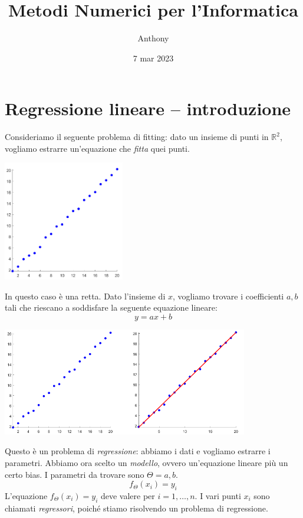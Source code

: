 \documentclass{article}
\title{Metodi Numerici per l'Informatica}
\author{Anthony}
\date{7 mar 2023}
\begin{document}
    \maketitle
    \section{Regressione lineare -- introduzione}
        Consideriamo il seguente problema di fitting: dato un insieme di punti in $\mathbb{R}^2$, vogliamo estrarre un'equazione 
        che \emph{fitta} quei punti.
        \begin{center}\includegraphics[width=5.3cm]{graph_01.png}\end{center}
        In questo caso è una retta. Dato l'insieme di $x$, vogliamo trovare i coefficienti $a, b$ tali che riescano a soddisfare la 
        seguente equazione lineare:
        \[y = ax + b\]
        \begin{center}\includegraphics[height=4.71cm]{graph_02.png} \end{center}
        Questo è un problema di \emph{regressione}: abbiamo i dati e vogliamo estrarre i parametri. Abbiamo ora scelto un \emph{modello},
        ovvero un'equazione lineare più un certo bias. I parametri da trovare sono $\Theta = {a,b}$.
            \[f_\Theta(x_i) = y_i \]
        L'equazione $f_\Theta(x_i) = y_i$ deve valere per $i=1, \dots, n$. I vari punti $x_i$ sono chiamati \emph{regressori}, poiché stiamo risolvendo un problema di regressione.
\end{document}
